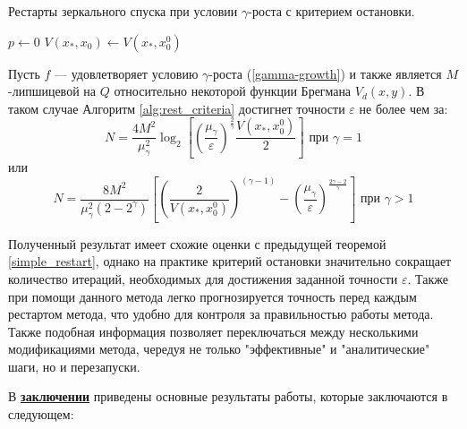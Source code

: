  \begin{algorithm}[htp]
     \caption{Рестарты зеркального спуска при условии $\gamma$-роста с критерием остановки.}
     \label{alg:rest_criteria}
     $p \gets 0$\;
     $V(x_*, x_0) \gets V(x_*,x_0^0)$\;
 \end{algorithm}
 \begin{theorem}
     Пусть $f$ --- удовлетворяет условию $\gamma$-роста (\ref{gamma-growth}) и также является $M$-липшицевой на $Q$ относительно некоторой функции Брегмана $V_d(x, y)$. В таком случае Алгоритм \ref{alg:rest_criteria} достигнет точности $\varepsilon$ не более чем за:
     \begin{equation}
        N =  \frac{4 M^2}{\mu_{\gamma}^2} \log_2{\left[\left(\frac{\mu_{\gamma}}{\varepsilon}\right)^{\frac{2}{\gamma}} \frac{V(x_*, x_0^0)}{2}\right]} \text{ при } \gamma = 1
    \end{equation}
    или
    \begin{equation}
        N = \frac{8  M^2}{\mu_{\gamma}^2 (2 - 2^{\gamma})} \left[ \left(\frac{2}{V(x_*, x_0^0)}\right)^{(\gamma - 1)}  - \left(\frac{\mu_{\gamma}}{\varepsilon}\right)^{\frac{2\gamma - 2}{\gamma}} \right] \text{ при } \gamma > 1
    \end{equation}
 \end{theorem}

 Полученный результат имеет схожие оценки с предыдущей теоремой \ref{simple_restart}, однако на практике критерий остановки значительно сокращает количество итераций, необходимых для достижения заданной точности $\varepsilon$. Также при помощи данного метода легко прогнозируется точность перед каждым рестартом метода, что удобно для контроля за правильностью работы метода. Также подобная информация позволяет переключаться между несколькими модификациями метода, чередуя не только "эффективные" и "аналитические" шаги, но и перезапуски.  

\FloatBarrier
{}                                  %
В \underline{\textbf{заключении}} приведены основные результаты работы, которые заключаются в следующем:


